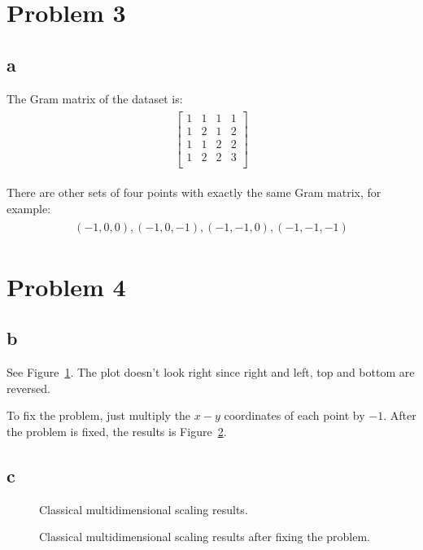 \documentclass[a4paper,11pt]{article}
\theoremstyle{mytheor}
\begin{document}
\section*{Problem 3}
\subsection*{a}
The Gram matrix of the dataset is:
\begin{align}
    \begin{split}
        \begin{bmatrix}
        1   &  1 &    1   &  1 \\
        1   &  2   &  1    & 2 \\
        1    & 1    & 2    & 2 \\
        1   &  2   &  2   &  3 \\
        \end{bmatrix}
    \end{split}
\end{align}

There are other sets of four points with exactly the same Gram matrix, for example:
\begin{align}
\begin{split}
(-1, 0,0), (-1, 0, -1), (-1, -1, 0), (-1, -1, -1)
\end{split}
\end{align}

\section*{Problem 4}
\subsection*{b}
See Figure~\ref{fig:4b0}. The plot doesn't look right since right and left, top and bottom are reversed.

To fix the problem, just multiply the $x-y$ coordinates of each point by $-1$. After the problem is fixed,
the results is Figure~\ref{fig:4b1}.

\subsection*{c}


\begin{figure}[h]
    \caption{Classical multidimensional scaling results.}
    \label{fig:4b0}
\end{figure}


\begin{figure}[h]
    \caption{Classical multidimensional scaling results after fixing the problem.}
    \label{fig:4b1}
\end{figure}
\end{document}
